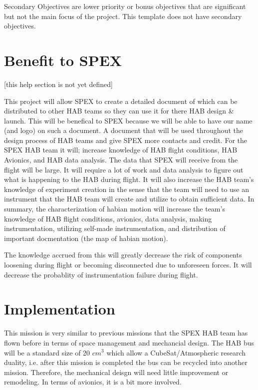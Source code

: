 \documentclass[journal]{SPEXformat}
\newenvironment{help}{
  \ttfamily\footnotesize\sloppy
  \begin{lrbox}{\helpbox}\begin{minipage}{\linewidth}
  }{
  \end{minipage}\end{lrbox}
  \ifbool{showhelp}{
    \fbox{\usebox{\helpbox}}
  }{}
}
\begin{document}

\begin{help}
  Secondary Objectives are lower priority or bonus objectives that are significant but not the main focus of the project. This template does not have secondary objectives.
\end{help}

\section{Benefit to SPEX}
\label{sec:benefit}
\begin{help}
  [this help section is not yet defined]
\end{help}
  This project will allow SPEX to create a detailed document of which can be distributed to other HAB teams
  so they can use it for there HAB design & launch. This will be benefical to SPEX because we will be able to have
  our name (and logo) on such a document. A document that will be used throughout the design process of HAB teams
  and give SPEX more contacts and credit.
  For the SPEX HAB team it will; increase knowledge of HAB flight conditions, HAB Avionics, and HAB data analysis. The data
  that SPEX will receive from the flight will be large. It will require a lot of work and data analysis to figure out what is
  happening to the HAB during flight. It will also increase the HAB team's knowledge of experiment creation in the sense that
  the team will need to use an instrument that the HAB team will create and utilize to obtain sufficient data.
  In summary, the characterization of habian motion will increase the team's knowledge of HAB flight conditions, avionics, data analysis,
  making instrumentation, utilizing self-made instrumentation, and distribution of important docmentation (the map of habian motion).

  The knowledge accrued from this will greatly decrease the risk of components loosening during flight or becoming
  disconnected due to unforeseen forces. It will decrease the probablity of instrumentation failure during flight.
\section{Implementation}
\label{sec:implementation}
  This mission is very similar to previous missions that the SPEX HAB team has flown before in terms of space management and mechancial
  design. The HAB bus will be a standard size of 20 $cm^3$ which allow a CubeSat/Atmospheric research duality, i.e. after this mission is
  completed the bus can be recycled into another mission. Therefore, the mechanical deisgn will need little improvement or remodeling.
  In terms of avionics, it is a bit more involved.
\end{document}
